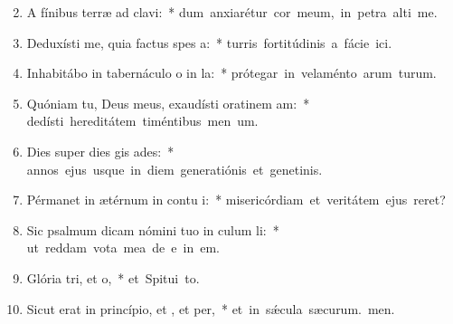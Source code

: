 \begin{flushleft}
\begin{enumerate}[leftmargin=*]
\setcounter{enumi}{1}

\item A fínibus terræ ad  clavi:~* \mbox{dum anxiarétur cor meum, in petra alti me.}

\item Deduxísti me, quia factus  spes a:~* \mbox{turris fortitúdinis a fácie ici.}

\item Inhabitábo in tabernáculo o in la:~* \mbox{prótegar in velaménto arum turum.}

\item Quóniam tu, Deus meus, exaudísti oratinem am:~* \mbox{dedísti hereditátem timéntibus men um.}

\item Dies super dies gis ades:~* \mbox{annos ejus usque in diem generatiónis et genetinis.}

\item Pérmanet in ætérnum in contu i:~* \mbox{misericórdiam et veritátem ejus  reret?}

\item Sic psalmum dicam nómini tuo in culum li:~* \mbox{ut reddam vota mea de e in em.}

\item Glória tri, et o,~* \mbox{et Spitui to.}

\item Sicut erat in princípio, et , et per,~* \mbox{et in sǽcula sæcurum. men.}

\end{enumerate}
\end{flushleft}